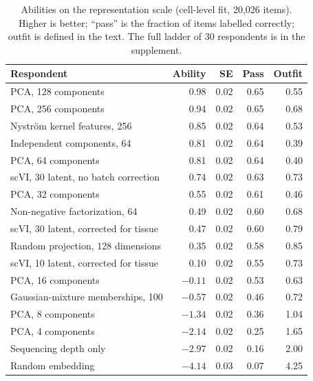 \documentclass[11pt]{article}
\begin{document}
\begin{table}[t]
\centering
\small
\caption{Abilities on the representation scale (cell-level fit, 20,026 items). Higher is
better; ``pass'' is the fraction of items labelled correctly; outfit is defined in the
text. The full ladder of 30 respondents is in the supplement.}
\label{tab:abilA}
\begin{tabular}{@{}lrrrr@{}}
\toprule
Respondent & Ability & SE & Pass & Outfit \\
\midrule
PCA, 128 components & 0.98 & 0.02 & 0.65 & 0.55 \\
PCA, 256 components & 0.94 & 0.02 & 0.65 & 0.68 \\
Nystr\"om kernel features, 256 & 0.85 & 0.02 & 0.64 & 0.53 \\
Independent components, 64 & 0.81 & 0.02 & 0.64 & 0.39 \\
PCA, 64 components & 0.81 & 0.02 & 0.64 & 0.40 \\
scVI, 30 latent, no batch correction & 0.74 & 0.02 & 0.63 & 0.73 \\
PCA, 32 components & 0.55 & 0.02 & 0.61 & 0.46 \\
Non-negative factorization, 64 & 0.49 & 0.02 & 0.60 & 0.68 \\
scVI, 30 latent, corrected for tissue & 0.47 & 0.02 & 0.60 & 0.79 \\
Random projection, 128 dimensions & 0.35 & 0.02 & 0.58 & 0.85 \\
scVI, 10 latent, corrected for tissue & 0.10 & 0.02 & 0.55 & 0.73 \\
PCA, 16 components & $-0.11$ & 0.02 & 0.53 & 0.63 \\
Gaussian-mixture memberships, 100 & $-0.57$ & 0.02 & 0.46 & 0.72 \\
PCA, 8 components & $-1.34$ & 0.02 & 0.36 & 1.04 \\
PCA, 4 components & $-2.14$ & 0.02 & 0.25 & 1.65 \\
Sequencing depth only & $-2.97$ & 0.02 & 0.16 & 2.00 \\
Random embedding & $-4.14$ & 0.03 & 0.07 & 4.25 \\
\bottomrule
\end{tabular}
\end{table}
\end{document}
